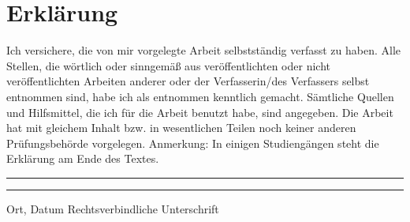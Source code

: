 \documentclass[a4paper,11pt]{article}%
\renewcommand{\\}{\vspace*{0.5\baselineskip} \newline}
\begin{document}
\section*{Erklärung}
Ich versichere, die von mir vorgelegte Arbeit selbstständig verfasst zu haben. Alle Stellen, die wörtlich oder sinngemäß aus veröffentlichten oder nicht veröffentlichten Arbeiten anderer oder der Verfasserin/des Verfassers selbst entnommen sind, habe ich als entnommen kenntlich gemacht. Sämtliche Quellen und Hilfsmittel, die ich für die Arbeit benutzt habe, sind angegeben. Die Arbeit hat mit gleichem Inhalt bzw. in wesentlichen Teilen noch keiner anderen Prüfungsbehörde vorgelegen.\\
Anmerkung: In einigen Studiengängen steht die Erklärung am Ende des Textes.\\
~\\
~\\
\rule{0.35\textwidth}{0.4pt} \hspace*{3cm} \rule{0.45\textwidth}{0.4pt} \newline
Ort, Datum	\hspace*{6.3cm}	Rechtsverbindliche Unterschrift
\newpage
\end{document}
